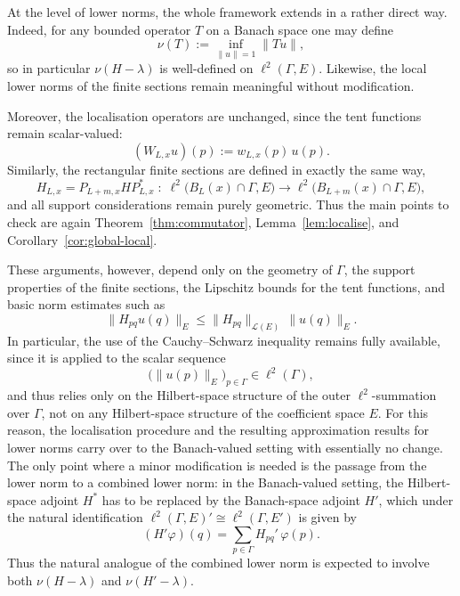 \documentclass[11pt]{article}
\theoremstyle{definition}
\begin{document}
At the level of lower norms, the whole framework extends in a rather direct way. Indeed, for any bounded operator $T$ on a Banach space one may define
\[
  \nu(T):=\inf_{\|u\|=1}\|Tu\|,
\]
so in particular $\nu(H-\lambda)$ is well-defined on $\ell^2(\Gamma,E)$. Likewise, the local lower norms of the finite sections remain meaningful without modification.

Moreover, the localisation operators are unchanged, since the tent functions remain scalar-valued:
\[
  (W_{L,x}u)(p):=w_{L,x}(p)\,u(p).
\]
Similarly, the rectangular finite sections are defined in exactly the same way,
\[
  H_{L,x}=P_{L+m,x}HP_{L,x}^*
  \;:\;
  \ell^2\bigl(B_L(x)\cap\Gamma,E\bigr)
  \longrightarrow
  \ell^2\bigl(B_{L+m}(x)\cap\Gamma,E\bigr),
\]
and all support considerations remain purely geometric. Thus the main points to check are again Theorem~\ref{thm:commutator}, Lemma~\ref{lem:localise}, and Corollary~\ref{cor:global-local}.

These arguments, however, depend only on the geometry of $\Gamma$, the support properties of the finite sections, the Lipschitz bounds for the tent functions, and basic norm estimates such as
\[
  \|H_{pq}u(q)\|_E
  \le
  \|H_{pq}\|_{\mathcal L(E)}\,\|u(q)\|_E.
\]
In particular, the use of the Cauchy--Schwarz inequality remains fully available, since it is applied to the scalar sequence
\[
  \bigl(\|u(p)\|_E\bigr)_{p\in\Gamma}\in \ell^2(\Gamma),
\]
and thus relies only on the Hilbert-space structure of the outer $\ell^2$-summation over $\Gamma$, not on any Hilbert-space structure of the coefficient space $E$. For this reason, the localisation procedure and the resulting approximation results for lower norms carry over to the Banach-valued setting with essentially no change. The only point where a minor modification is needed is the passage from the lower norm to a combined lower norm: in the Banach-valued setting, the Hilbert-space adjoint $H^*$ has to be replaced by the Banach-space adjoint $H'$, which under the natural identification $\ell^2(\Gamma,E)'\cong \ell^2(\Gamma,E')$ is given by
\[
  (H'\varphi)(q)=\sum_{p\in\Gamma} H_{pq}'\,\varphi(p).
\]
Thus the natural analogue of the combined lower norm is expected to involve both $\nu(H-\lambda)$ and $\nu(H'-\lambda)$.
\end{document}
